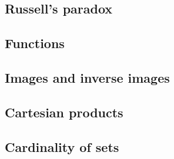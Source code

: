 \documentclass[12pt]{article}
\theoremstyle{definition}
\theoremstyle{remark}
\begin{document}
\subsection{Russell's paradox}

\subsection{Functions}

\subsection{Images and inverse images}

\subsection{Cartesian products}

\subsection{Cardinality of sets}
\end{document}
